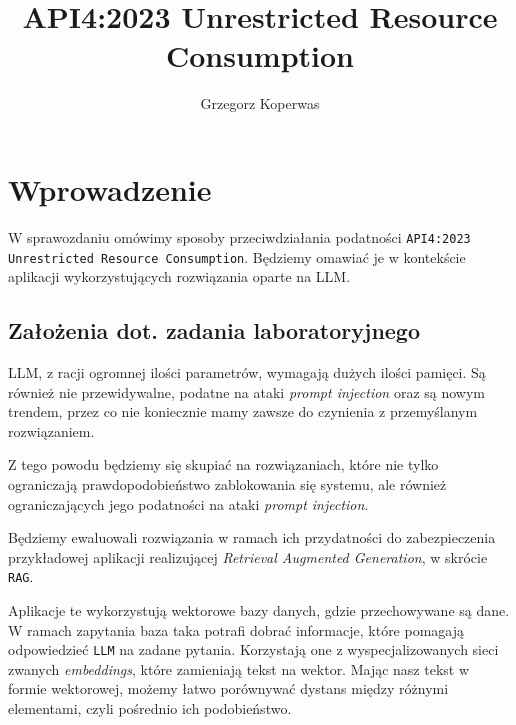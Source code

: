 \documentclass[12pt,aspectratio=169]{beamer}
\title{API4:2023 Unrestricted Resource Consumption}
\author{Grzegorz Koperwas}
\begin{document}
\begin{frame}
\maketitle
\end{frame}

\section{Wprowadzenie}
\begin{frame}
W sprawozdaniu omówimy sposoby przeciwdziałania podatności \texttt{API4:2023
Unrestricted Resource Consumption}. Będziemy omawiać je w kontekście aplikacji 
wykorzystujących rozwiązania oparte na LLM.
\end{frame}

\subsection{Założenia dot. zadania laboratoryjnego}

\begin{frame}
LLM, z racji ogromnej ilości parametrów, wymagają dużych ilości pamięci. Są
również nie przewidywalne, podatne na ataki \emph{prompt injection} oraz są
nowym trendem, przez co nie koniecznie mamy zawsze do czynienia z przemyślanym
rozwiązaniem.
\end{frame}

\begin{frame}
Z tego powodu będziemy się skupiać na rozwiązaniach, które nie tylko ograniczają
prawdopodobieństwo zablokowania się systemu, ale również ograniczających jego
podatności na ataki \emph{prompt injection}.

Będziemy ewaluowali rozwiązania w ramach ich przydatności do zabezpieczenia 
przykładowej aplikacji realizującej \emph{Retrieval Augmented Generation}, w
skrócie \texttt{RAG}. 
\end{frame}

\begin{frame}
Aplikacje te wykorzystują wektorowe bazy danych, gdzie przechowywane są dane. W
ramach zapytania baza taka potrafi dobrać informacje, które pomagają
odpowiedzieć \texttt{LLM} na zadane pytania. Korzystają one z wyspecjalizowanych
sieci zwanych \emph{embeddings}, które zamieniają tekst na wektor. Mając nasz
tekst w formie wektorowej, możemy łatwo porównywać dystans między różnymi
elementami, czyli pośrednio ich podobieństwo.
\end{frame}
\end{document}
